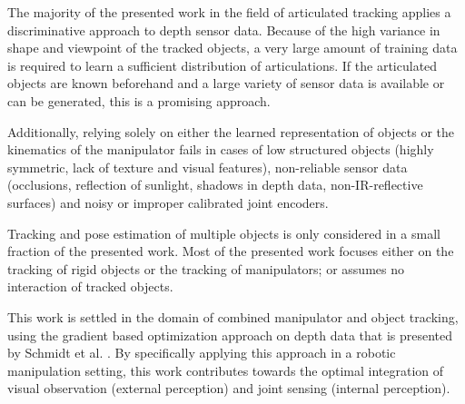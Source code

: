 The majority of the presented work in the field of articulated tracking applies a discriminative approach to depth sensor data. Because of the high variance in shape and viewpoint of the tracked objects, a very large amount of training data is required to learn a sufficient distribution of articulations. If the articulated objects are known beforehand and a large variety of sensor data is available or can be generated, this is a promising approach.

Additionally, relying solely on either the learned representation of objects or the kinematics of the manipulator fails in cases of low structured objects (highly symmetric, lack of texture and visual features), non-reliable sensor data (occlusions, reflection of sunlight, shadows in depth data, non-IR-reflective surfaces) and noisy or improper calibrated joint encoders.

Tracking and pose estimation of multiple objects is only considered in a small fraction of the presented work. Most of the presented work focuses either on the tracking of rigid objects or the tracking of manipulators; or assumes no interaction of tracked objects.


This work is settled in the domain of combined manipulator and object tracking, using the gradient based optimization approach on depth data that is presented by Schmidt et al. \cite{Schmidt2015}.
By specifically applying this approach in a robotic manipulation setting, this work contributes towards the optimal integration of visual observation (external perception) and joint sensing (internal perception).
